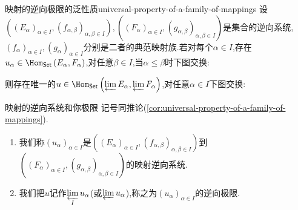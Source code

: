 \begin{corollary}{映射的逆向极限的泛性质}{universal-property-of-a-family-of-mappings}
	设$\left(\left(E_{\alpha}\right)_{\alpha\in I},\left(f_{\alpha,\beta}\right)_{\alpha,\beta\in I}\right),\left(\left(F_{\alpha}\right)_{\alpha\in I},\left(g_{\alpha,\beta}\right)_{\alpha,\beta\in I}\right)$是集合的逆向系统,$\left(f_{\alpha}\right)_{\alpha\in I},\left(g_{\alpha}\right)_{\alpha\in I}$分别是二者的典范映射族.若对每个$\alpha\in I$,存在$u_{\alpha}\in\Hom_{\mathsf{Set}}\left(E_{\alpha},F_{\alpha}\right)$,对任意$\beta\in I$,当$\alpha\leq\beta$时下图交换:
	\begin{center}
	\end{center}
	则存在唯一的$u\in\Hom_{\mathsf{Set}}\left(\varprojlim E_{\alpha},\varprojlim F_{\alpha}\right)$,对任意$\alpha\in I$下图交换:
	\begin{center}
	\end{center}
\end{corollary}

\begin{definition}{映射的逆向系统和你极限}{}
	记号同推论(\cref{cor:universal-property-of-a-family-of-mappings}).
	\begin{enumerate}
		\item 我们称$\left(u_{\alpha}\right)_{\alpha\in I}$是$\left(\left(E_{\alpha}\right)_{\alpha\in I},\left(f_{\alpha,\beta}\right)_{\alpha,\beta\in I}\right)$到$\left(\left(F_{\alpha}\right)_{\alpha\in I},\left(g_{\alpha,\beta}\right)_{\alpha,\beta\in I}\right)$的映射逆向系统.
		\item 我们把$u$记作$\varprojlim\limits_{I}u_{\alpha}$(或$\varprojlim u_{\alpha}$),称之为$\left(u_{\alpha}\right)_{\alpha\in I}$的逆向极限.
	\end{enumerate}
\end{definition}

